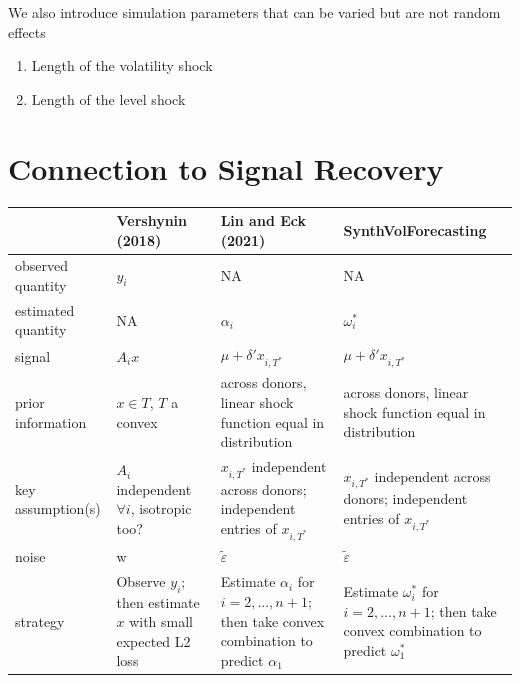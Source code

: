 \documentclass[11pt]{article}
\def\t#1{\tilde{#1}} %
\theoremstyle{definition}
\begin{document}
We also introduce simulation parameters that can be varied but are not random effects

\begin{enumerate}
  \item Length of the volatility shock
  \item Length of the level shock
\end{enumerate}

\section{Connection to Signal Recovery}


\begin{table}[]
\begin{tabular}{|p{1.3in}|p{1.6in}|p{1.9in}|p{1.9in}|}
\hline
 & Vershynin (2018) & Lin and Eck (2021) & SynthVolForecasting \\ \hline
observed quantity& $y_{i}$  & NA & NA \\ \hline
estimated quantity&  NA& $\alpha_{i}$ &  $\omega^{*}_{i}$\\ \hline
signal & $A_{i}x$ & $\mu + \delta'x_{i,T^{*}}$ & $\mu + \delta'x_{i,T^{*}}$  \\ \hline
prior information & $x\in T$, $T$ a convex & across donors, linear shock function equal in distribution  &  across donors, linear shock function equal in distribution \\ \hline
key assumption(s) & $A_{i}$ independent $\forall i$, isotropic too? & $x_{i,T^{*}}$ independent across donors; independent entries of $x_{i,T^{*}}$ & $x_{i,T^{*}}$ independent across donors; independent entries of $x_{i,T^{*}}$ \\ \hline
noise& w & $\t\varepsilon$  & $\t\varepsilon$   \\ \hline
strategy& Observe $y_{i}$; then estimate $x$ with small expected L2 loss & Estimate $\alpha_{i}$ for $i = 2,...,n+1$; then take convex combination to predict $\alpha_{1}$  & Estimate $\omega^{*}_{i}$ for $i = 2,...,n+1$; then take convex combination to predict $\omega^{*}_{1}$ \\ \hline
\end{tabular}
\end{table}

\clearpage



%

  
\end{document}
